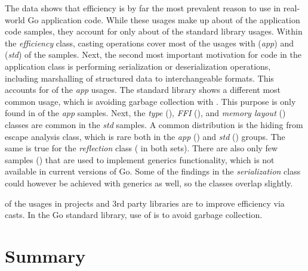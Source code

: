 

The data shows that efficiency is by far the most prevalent reason to use \unsafe{} in real-world Go application code.
While these usages make up about  of the application code samples, they account for only about
 of the standard library usages.
Within the \textit{efficiency} class, casting operations cover most of the usages with  (\textit{app})
and  (\textit{std}) of the samples.
Next, the second most important motivation for \unsafe{} code in the application class is performing serialization or
deserialization operations, including marshalling of structured data to interchangeable formats.
This accounts for  of the \textit{app} usages.
The standard library shows a different most common usage, which is avoiding garbage collection with .
This purpose is only found in  of the \textit{app} samples.
Next, the \textit{type} (), \textit{\acrshort{FFI}} (), and \textit{memory layout}
() classes are common in the \textit{std} samples.
A common distribution is the hiding from escape analysis class, which is rare both in the \textit{app}
() and \textit{std} () groups.
The same is true for the \textit{reflection} class ( in both sets).
There are also only few samples () that are used to implement generics functionality, which is not
available in current versions of Go.
Some of the findings in the \textit{serialization} class could however be achieved with generics as well, so the classes
overlap slightly.

\begin{answerToRQ}[\ref{rq:purpose}]
     of the \unsafe{} usages in projects and 3rd party libraries are to improve efficiency via
    \unsafe{} casts.
    In the Go standard library,  use of \unsafe{} is to avoid garbage collection.
\end{answerToRQ}



\section{Summary}\label{sec:go-geiger:summary}

